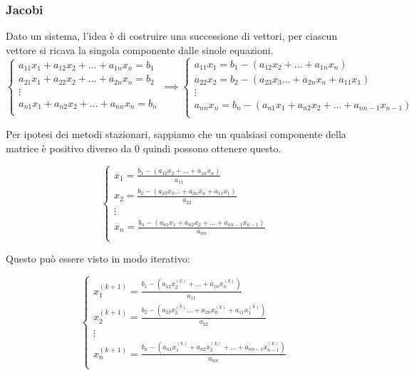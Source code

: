 \subsubsection{Jacobi}
Dato un sistema, l'idea è di costruire una successione di vettori, per ciascun 
vettore si ricava la singola componente dalle sinole equazioni.
\begin{equation}
    \begin{cases}
        a_{11}x_1 + a_{12} x_2 + \dots + a_{1n} x_n= b_1 \\
        a_{21}x_1 + a_{22} x_2 + \dots + a_{2n} x_n= b_2 \\
        \vdots                                           \\
        a_{n1}x_1 + a_{n2} x_2 + \dots + a_{nn} x_n= b_n \\
    \end{cases}\implies
    \begin{cases}
        a_{11}x_1 = b_1 - (a_{12} x_2 + \dots + a_{1n} x_n) \\
        a_{22} x_2 = b_2 - (a_{23} x_3\dots + a_{2n} x_n + a_{11}x_1)\\
        \vdots                                           \\
        a_{nn} x_n= b_n - (a_{n1}x_1 + a_{n2} x_2 + \dots + a_{nn-1} x_{n-1})\\
    \end{cases}
\end{equation}

Per ipotesi dei metodi stazionari, sappiamo che un qualsiasi componente 
della matrice è positivo diverso da $0$ quindi possono ottenere questo.

\begin{equation*}
    \begin{cases}
        x_1 = \frac{b_1 - (a_{12} x_2 + \dots + a_{1n} x_n)}{ a_{11}} \\
        x_2 =\frac{ b_2 - (a_{23} x_3\dots + a_{2n} x_n + a_{11}x_1)}{a_{22}}\\
        \vdots                                           \\
        x_n= \frac{b_n - (a_{n1}x_1 + a_{n2} x_2 + \dots + a_{nn-1} x_{n-1})}{a_{nn}}\\
    \end{cases}
\end{equation*}

Questo può essere visto in modo iterativo:

\begin{equation*}
    \begin{cases}
        x_1^{(k+1)} = \frac{b_1 - (a_{12} x_2^{(k)} + \dots + a_{1n} x_n^{(k)})}{ a_{11}} \\
        x_2^{(k+1)} =\frac{ b_2 - (a_{23} x_3^{(k)}\dots + a_{2n} x_n^{(k)} + a_{11}x_1^{(k)})}{a_{22}}\\
        \vdots                                           \\
        x_n^{(k+1)}= \frac{b_n - (a_{n1}x_1^{(k)} + a_{n2} x_2^{(k)} + \dots + a_{nn-1} x_{n-1}^{(k)})}{a_{nn}}\\
    \end{cases}
\end{equation*}

